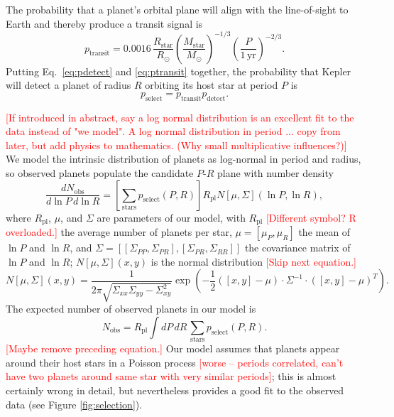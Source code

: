 \documentclass{nature}
\newcommand{\RSun}{R_\odot}
\newcommand{\RStar}{R_\mathrm{star}}
\newcommand{\MStar}{M_\mathrm{star}}
\newcommand{\MSun}{M_\odot}
\newcommand{\Rpl}{R_\mathrm{pl}}
\newcommand{\ilya}[1]{\textcolor{red}{#1}}
\begin{document}
The probability that a planet's orbital plane will align with the line-of-sight to
Earth and thereby produce a transit signal is
\begin{equation}
  \label{eq:ptransit}
  p_\mathrm{transit} = 0.0016\, \frac{\RStar}{\RSun}
  \left(\frac{\MStar}{\MSun}\right)^{-1/3} \left(\frac{P}{1\,\mathrm{yr}}\right)^{-2/3}.
\end{equation}
Putting Eq.\ \ref{eq:pdetect} and \ref{eq:ptransit} together, the
probability that Kepler will detect a planet of radius $R$ orbiting
its host star at period $P$ is 
\begin{equation}
  p_\mathrm{select} = p_\mathrm{transit} p_\mathrm{detect}.
\end{equation}

\ilya{[If introduced in abstract, say a log normal distribution is an excellent fit to the data instead of "we model".
A log normal distribution in period ... copy from later, but add physics to mathematics.  (Why small multiplicative influences?)] } 
We model the intrinsic distribution of planets as log-normal in period
and radius, so observed planets populate the candidate $P$-$R$ plane
with number density
\begin{equation}
  \label{eq:foreground-rate}
  \frac{dN_\mathrm{obs}}{d\ln P\, d\ln R} = \left[ \sum_\mathrm{stars}
    p_\mathrm{select}(P, R) \right] \Rpl N\left[ \mu, \Sigma
    \right]\left( \ln P, \ln R \right),
\end{equation}
where $\Rpl$, $\mu$, and $\Sigma$ are parameters of our model, with
$\Rpl$ \ilya{[Different symbol? R overloaded.]} the average number of planets per star, $\mu = \left[ \mu_P,
  \mu_R \right]$ the mean of $\ln P$ and $\ln R$, and $\Sigma = \left[
  \left[ \Sigma_{PP}, \Sigma_{PR} \right], \left[ \Sigma_{PR},
    \Sigma_{RR} \right]\right]$ the covariance matrix of $\ln P$ and
$\ln R$; $N\left[ \mu, \Sigma \right](x,y)$ is the normal distribution  \ilya{[Skip next equation.]}
\begin{equation}
  N\left[ \mu, \Sigma \right](x,y) = \frac{1}{2 \pi \sqrt{\Sigma_{xx}
      \Sigma_{yy} - \Sigma_{xy}^2}} \exp\left( - \frac{1}{2} \left(\left[
    x,y \right] - \mu \right) \cdot \Sigma^{-1} \cdot \left(\left[ x,
    y\right] - \mu \right)^T \right).
\end{equation}
The expected number of observed planets in our model is
\begin{equation}
  N_\mathrm{obs} = \Rpl \int dP\,dR\, \sum_\mathrm{stars} p_\mathrm{select}(P,
  R).
\end{equation}
\ilya{[Maybe remove preceding equation.]}
Our model assumes that planets appear around their host stars in a
Poisson process \ilya{[worse -- periods correlated, can't have two planets around same star with very similar periods]}; this is almost certainly wrong in
detail\cite{Weissbein2012}, but nevertheless provides a good fit to
the observed data (see Figure \ref{fig:selection}).
\end{document}
